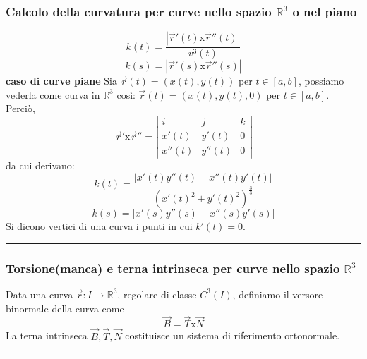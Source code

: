 \subsubsection{Calcolo della curvatura per curve nello spazio $\mathbb{R}^3$ o nel piano}
\[
    k(t) = \frac{|\vec{r}'(t) \text{x} \vec{r}''(t)|}{v^3(t)}
\]
\[
    k(s) = |\vec{r}'(s) \text{x} \vec{r}''(s)|
\]
\newline
\textbf{caso di curve piane}\newline
Sia $\vec{r}(t) =(x(t), y(t))$ per $t \in[a,b]$, possiamo vederla come curva in $\mathbb{R}^3$ così: $\vec{r}(t) = (x(t), y(t), 0)$ per $t \in[a,b]$.\newline
Perciò,
\[
    \vec{r}' \text{x} \vec{r}'' =\left|\begin{matrix}
        i \;\;& j \;\;& k \\
        x'(t) & y'(t) & 0\\
        x''(t) & y''(t) & 0
    \end{matrix} \right|
\]
da cui derivano:
\[
    k(t) = \frac{|x'(t)y''(t) - x''(t) y'(t)|}{(x'(t)^2 + y'(t)^2)^{\frac{3}{3}}}
\]
\[
    k(s) = |x'(s) y''(s) - x''(s) y'(s)|
\]
\newline
\newline
Si dicono vertici di una curva i punti in cui $k'(t) = 0$.\newline
\rule{\textwidth}{0,4pt}
\subsubsection{Torsione(manca) e terna intrinseca per curve nello spazio $\mathbb{R}^3$}
Data una curva $\vec{r} : I \rightarrow \mathbb{R}^3$, regolare di classe $C^3(I)$, definiamo il versore binormale della curva come
\[
    \vec{B} = \vec{T} \text{x} \vec{N}
\]
La terna intrinseca $\vec{B}, \vec{T}, \vec{N}$ costituisce un sistema di riferimento ortonormale.\newline
\rule{\textwidth}{2pt}
